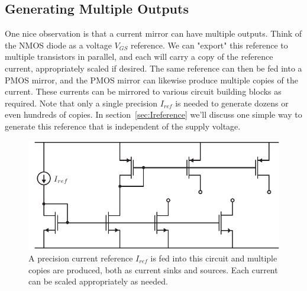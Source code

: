 \subsection{Generating Multiple Outputs}
One nice observation is that a current mirror can have multiple outputs.  Think of the NMOS diode as a voltage $V_{GS}$ reference.  We can "export" this reference to multiple transistors in parallel, and each will carry a copy of the reference current, appropriately scaled if desired.  The same reference can then be fed into a PMOS mirror, and the PMOS mirror can likewise produce multiple copies of the current.  These currents can be mirrored to various circuit building blocks as required.  Note that only a single precision $I_{ref}$ is needed to generate dozens or even hundreds of copies.  In section~\ref{sec:Ireference} we'll discuss one simple way to generate this reference that is independent of the supply voltage.
\begin{figure}[tb]
\centering
\includegraphics[scale=1]{19current_mirror_multioutput.pdf}
\caption{A precision current reference $I_{ref}$ is fed into this circuit and multiple copies are produced, both as current sinks and sources.  Each current can be scaled appropriately as needed.} \label{fig:19current_mirror_multioutput.pdf}
\end{figure}
\newpage
